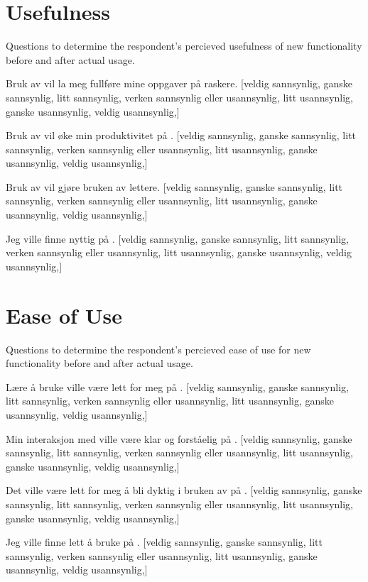 \section{Usefulness}

Questions to determine the respondent's percieved usefulness of new
functionality before and after actual usage.

\begin{items}
  \item Bruk av \siste{} vil la meg fullføre mine oppgaver på \urort{}
    raskere.
    [veldig sannsynlig, ganske sannsynlig, litt sannsynlig,
    verken sannsynlig eller usannsynlig,
    litt usannsynlig, ganske usannsynlig, veldig usannsynlig,]
  \item Bruk av \siste{} vil øke min produktivitet på \urort{}.
    [veldig sannsynlig, ganske sannsynlig, litt sannsynlig,
    verken sannsynlig eller usannsynlig,
    litt usannsynlig, ganske usannsynlig, veldig usannsynlig,]
  \item Bruk av \siste{} vil gjøre bruken av \urort{} lettere.
    [veldig sannsynlig, ganske sannsynlig, litt sannsynlig,
    verken sannsynlig eller usannsynlig,
    litt usannsynlig, ganske usannsynlig, veldig usannsynlig,]
  \item Jeg ville finne \siste{} nyttig på \urort{}.
    [veldig sannsynlig, ganske sannsynlig, litt sannsynlig,
    verken sannsynlig eller usannsynlig,
    litt usannsynlig, ganske usannsynlig, veldig usannsynlig,]
\end{items}

\section{Ease of Use}

Questions to determine the respondent's percieved ease of use for new
functionality before and after actual usage.

\begin{items}
  \item Lære å bruke \siste{} ville være lett for meg på \urort{}.
    [veldig sannsynlig, ganske sannsynlig, litt sannsynlig,
    verken sannsynlig eller usannsynlig,
    litt usannsynlig, ganske usannsynlig, veldig usannsynlig,]
  \item Min interaksjon med \siste{} ville være klar og forståelig
    på \urort{}.
    [veldig sannsynlig, ganske sannsynlig, litt sannsynlig,
    verken sannsynlig eller usannsynlig,
    litt usannsynlig, ganske usannsynlig, veldig usannsynlig,]
  \item Det ville være lett for meg å bli dyktig i bruken av \siste{}
    på \urort{}.
    [veldig sannsynlig, ganske sannsynlig, litt sannsynlig,
    verken sannsynlig eller usannsynlig,
    litt usannsynlig, ganske usannsynlig, veldig usannsynlig,]
  \item Jeg ville finne \siste{} lett å bruke på \urort{}.
    [veldig sannsynlig, ganske sannsynlig, litt sannsynlig,
    verken sannsynlig eller usannsynlig,
    litt usannsynlig, ganske usannsynlig, veldig usannsynlig,]
\end{items}

